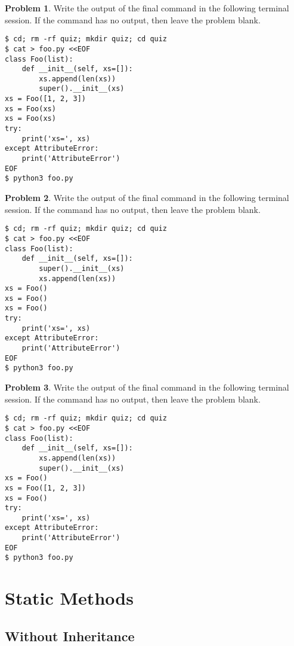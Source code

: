 \documentclass[10pt]{article}
\theoremstyle{definition}
\newtheorem{problem}{Problem}
\begin{document}
\filbreak
\begin{problem}
    Write the output of the final command in the following terminal session.
    If the command has no output, then leave the problem blank.
\end{problem}
\begin{lstlisting}
$ cd; rm -rf quiz; mkdir quiz; cd quiz
$ cat > foo.py <<EOF
class Foo(list):
    def __init__(self, xs=[]):
        xs.append(len(xs))
        super().__init__(xs)
xs = Foo([1, 2, 3])
xs = Foo(xs)
xs = Foo(xs)
try:
    print('xs=', xs)
except AttributeError:
    print('AttributeError') 
EOF
$ python3 foo.py
\end{lstlisting}

\filbreak
\begin{problem}
    Write the output of the final command in the following terminal session.
    If the command has no output, then leave the problem blank.
\end{problem}
\begin{lstlisting}
$ cd; rm -rf quiz; mkdir quiz; cd quiz
$ cat > foo.py <<EOF
class Foo(list):
    def __init__(self, xs=[]):
        super().__init__(xs)
        xs.append(len(xs))
xs = Foo()
xs = Foo()
xs = Foo()
try:
    print('xs=', xs)
except AttributeError:
    print('AttributeError') 
EOF
$ python3 foo.py
\end{lstlisting}

\filbreak
\begin{problem}
    Write the output of the final command in the following terminal session.
    If the command has no output, then leave the problem blank.
\end{problem}
\begin{lstlisting}
$ cd; rm -rf quiz; mkdir quiz; cd quiz
$ cat > foo.py <<EOF
class Foo(list):
    def __init__(self, xs=[]):
        xs.append(len(xs))
        super().__init__(xs)
xs = Foo()
xs = Foo([1, 2, 3])
xs = Foo()
try:
    print('xs=', xs)
except AttributeError:
    print('AttributeError') 
EOF
$ python3 foo.py
\end{lstlisting}


\section{Static Methods}

\subsection{Without Inheritance}
\end{document}
